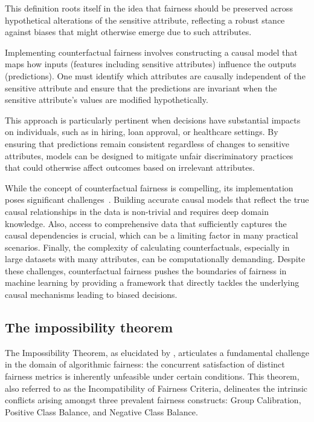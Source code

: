 This definition roots itself in the idea that fairness should be preserved across hypothetical alterations of the sensitive attribute, reflecting a robust stance against biases that might otherwise emerge due to such attributes.

Implementing counterfactual fairness involves constructing a causal model that maps how inputs (features including sensitive attributes) influence the outputs (predictions). One must identify which attributes are causally independent of the sensitive attribute and ensure that the predictions are invariant when the sensitive attribute's values are modified hypothetically.

This approach is particularly pertinent when decisions have substantial impacts on individuals, such as in hiring, loan approval, or healthcare settings. By ensuring that predictions remain consistent regardless of changes to sensitive attributes, models can be designed to mitigate unfair discriminatory practices that could otherwise affect outcomes based on irrelevant attributes.

While the concept of counterfactual fairness is compelling, its implementation poses significant challenges~\cite{Kasirzadeh2021}. Building accurate causal models that reflect the true causal relationships in the data is non-trivial and requires deep domain knowledge. Also, access to comprehensive data that sufficiently captures the causal dependencies is crucial, which can be a limiting factor in many practical scenarios. Finally, the complexity of calculating counterfactuals, especially in large datasets with many attributes, can be computationally demanding. Despite these challenges, counterfactual fairness pushes the boundaries of fairness in machine learning by providing a framework that directly tackles the underlying causal mechanisms leading to biased decisions. 

\subsection{The impossibility theorem}

The Impossibility Theorem, as elucidated by \citet{Kleinberg2017}, articulates a fundamental challenge in the domain of algorithmic fairness: the concurrent satisfaction of distinct fairness metrics is inherently unfeasible under certain conditions. This theorem, also referred to as the Incompatibility of Fairness Criteria, delineates the intrinsic conflicts arising amongst three prevalent fairness constructs: Group Calibration, Positive Class Balance, and Negative Class Balance.

